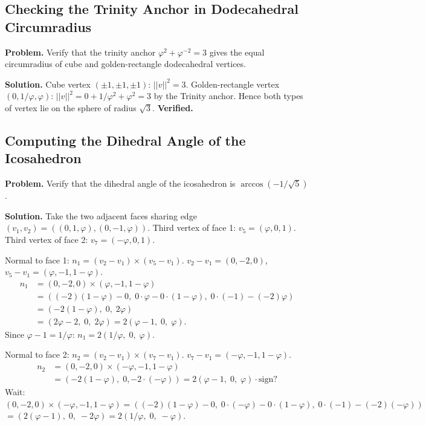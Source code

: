 \subsection{Checking the Trinity Anchor in Dodecahedral Circumradius}
\label{subsec:example-trinity-check}

\textbf{Problem.} Verify that the trinity anchor $\varphi^2 + \varphi^{-2} = 3$
gives the equal circumradius of cube and golden-rectangle dodecahedral vertices.

\textbf{Solution.}  Cube vertex $(\pm 1,\pm 1,\pm 1)$: $||v||^2 = 3$.
Golden-rectangle vertex $(0, 1/\varphi, \varphi)$: $||v||^2 = 0 + 1/\varphi^2 + \varphi^2 = 3$
by the Trinity anchor.  Hence both types of vertex lie on the sphere of radius $\sqrt{3}$.
\hfill\textbf{Verified.}

\subsection{Computing the Dihedral Angle of the Icosahedron}
\label{subsec:example-icos-dihedral}

\textbf{Problem.} Verify that the dihedral angle of the icosahedron is
$\arccos(-1/\sqrt{5})$.

\textbf{Solution.}  Take the two adjacent faces sharing edge $(v_1,v_2) = ((0,1,\varphi),(0,-1,\varphi))$.
Third vertex of face 1: $v_5 = (\varphi,0,1)$.  Third vertex of face 2: $v_7 = (-\varphi,0,1)$.

Normal to face 1: $n_1 = (v_2-v_1)\times(v_5-v_1)$.
$v_2 - v_1 = (0,-2,0)$, $v_5 - v_1 = (\varphi,-1,1-\varphi)$.
\begin{align*}
n_1 &= (0,-2,0) \times (\varphi,-1,1-\varphi) \\
    &= ((-2)(1-\varphi)-0,\;0\cdot\varphi - 0\cdot(1-\varphi),\;0\cdot(-1)-(-2)\varphi) \\
    &= (-2(1-\varphi),\;0,\;2\varphi) \\
    &= (2\varphi-2,\;0,\;2\varphi) = 2(\varphi-1,\;0,\;\varphi).
\end{align*}
Since $\varphi-1 = 1/\varphi$: $n_1 = 2(1/\varphi,\;0,\;\varphi)$.

Normal to face 2: $n_2 = (v_2-v_1)\times(v_7-v_1)$.
$v_7 - v_1 = (-\varphi,-1,1-\varphi)$.
\begin{align*}
n_2 &= (0,-2,0)\times(-\varphi,-1,1-\varphi) \\
    &= (-2(1-\varphi),\;0,-2\cdot(-\varphi)) = 2(\varphi-1,\;0,\;\varphi) \cdot \mathrm{sign?}
\end{align*}
Wait: $(0,-2,0)\times(-\varphi,-1,1-\varphi) = ((-2)(1-\varphi)-0,\; 0\cdot(-\varphi)-0\cdot(1-\varphi),\; 0\cdot(-1)-(-2)(-\varphi))$
$= (2(\varphi-1),\;0,\;-2\varphi) = 2(1/\varphi,\;0,\;-\varphi)$.

